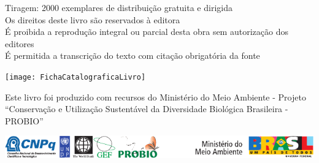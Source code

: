 \documentclass[a4paper,11pt,twoside,showtrims,onecolumn,openright,final]{memoir}
\begin{document}
\begin{scriptsize}
\begin{flushleft}
\vspace*{\baselineskip}

Tiragem: 2000 exemplares de distribuição gratuita e dirigida \\


Os direitos deste livro são reservados à editora \\
É proibida a reprodução integral ou parcial desta obra sem autorização dos editores \\
É permitida a transcrição do texto com citação obrigatória da fonte \\


\end{flushleft}

\begin{flushright}

\texttt{[image: FichaCatalograficaLivro]}

\end{flushright}

\vspace*{1cm}
% 
% 
% 

\begin{flushleft}

Este livro foi produzido com recursos do Ministério do Meio Ambiente - Projeto
``Conservação e Utilização Sustentável da Diversidade Biológica Brasileira - PROBIO''

\includegraphics[width=\textwidth]{LOGO_PROBIO}
\end{flushleft}

\end{scriptsize}



% 
% 
\end{document}
